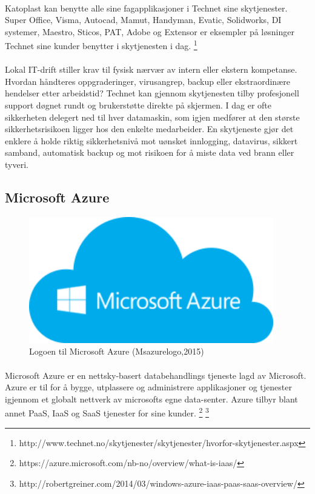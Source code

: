 \paragraph{} Katoplast kan benytte alle sine fagapplikasjoner i Technet sine skytjenester. Super Office, Visma, Autocad, Mamut, Handyman, Evatic, Solidworks, DI systemer, Maestro, Sticos, PAT, Adobe og Extensor er eksempler på løsninger Technet sine kunder benytter i skytjenesten i dag. \footnote{http://www.technet.no/skytjenester/skytjenester/hvorfor-skytjenester.aspx}

\paragraph{}Lokal IT-drift stiller krav til fysisk nærvær av intern eller ekstern kompetanse. Hvordan håndteres oppgraderinger, virusangrep, backup eller ekstraordinære hendelser etter arbeidstid? Technet kan gjennom skytjenesten tilby profesjonell support døgnet rundt og brukerstøtte direkte på skjermen. I dag er ofte sikkerheten delegert ned til hver datamaskin, som igjen medfører at den største sikkerhetsrisikoen ligger hos den enkelte medarbeider. En skytjeneste gjør det enklere å holde riktig sikkerhetsnivå mot uønsket innlogging, datavirus, sikkert samband, automatisk backup og mot risikoen for å miste data ved brann eller tyveri.

\subsection{Microsoft Azure}
\begin{figure}[H]
\centering
\includegraphics[width=4.2in]{Bilder/azure.png}
\caption{Logoen til Microsoft Azure (Msazurelogo,2015)}
\end{figure}

\paragraph{} Microsoft Azure er en nettsky-basert databehandlings tjeneste lagd av Microsoft. Azure er til for å bygge, utplassere og administrere applikasjoner og tjenester igjennom et globalt nettverk av microsofts egne data-senter. Azure tilbyr blant annet PaaS, IaaS og SaaS tjenester for sine kunder. 
\footnote{https://azure.microsoft.com/nb-no/overview/what-is-iaas/}
\footnote{http://robertgreiner.com/2014/03/windows-azure-iaas-paas-saas-overview/}

